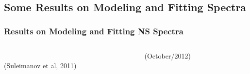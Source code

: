\begin{frame}
\begin{columns}[c]
\begin{column}{0.5\textwidth}
 \end{column}
 \end{columns}

\end{frame}


\subsection*{Some Results on Modeling and Fitting Spectra}

\begin{frame}
\frametitle{Results on Modeling and Fitting NS Spectra}
\begin{columns}[c]
\begin{column}{0.55\textwidth} 
 \\
 {\tiny (Suleimanov et al, 2011)}\\
 

\end{column}
\begin{column}{0.55\textwidth} 
  {\tiny (October/2012)}
 \end{column}
 \end{columns}
 
\end{frame}




